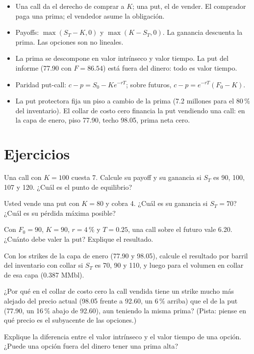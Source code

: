 \begin{resumen}
\begin{itemize}
\item Una call da el derecho de comprar a $K$; una put, el de vender. El comprador paga una prima; el vendedor asume la obligación.
\item Payoffs: $\max(S_T-K,0)$ y $\max(K-S_T,0)$. La ganancia descuenta la prima. Las opciones son no lineales.
\item La prima se descompone en valor intrínseco y valor tiempo. La put del informe (77.90 con $F=86.54$) está fuera del dinero: todo es valor tiempo.
\item Paridad put-call: $c-p=S_0-Ke^{-rT}$; sobre futuros, $c-p=e^{-rT}(F_0-K)$.
\item La put protectora fija un piso a cambio de la prima (7.2 millones para el 80\,\% del inventario). El collar de costo cero financia la put vendiendo una call: en la capa de enero, piso 77.90, techo 98.05, prima neta cero.
\end{itemize}
\end{resumen}

\section*{Ejercicios}

\ejercicio[cálculo] Una call con $K=100$ cuesta 7. Calcule su payoff y su ganancia si $S_T$ es 90, 100, 107 y 120. ¿Cuál es el punto de equilibrio?

\ejercicio[cálculo] Usted vende una put con $K=80$ y cobra 4. ¿Cuál es su ganancia si $S_T=70$? ¿Cuál es su pérdida máxima posible?

\ejercicio[cálculo] Con $F_0=90$, $K=90$, $r=4\,\%$ y $T=0.25$, una call sobre el futuro vale 6.20. ¿Cuánto debe valer la put? Explique el resultado.

\ejercicio[cálculo] Con los strikes de la capa de enero (77.90 y 98.05), calcule el resultado por barril del inventario con collar si $S_T$ es 70, 90 y 110, y luego para el volumen en collar de esa capa (0.387 MMbl).

\ejercicio[conceptual] ¿Por qué en el collar de costo cero la call vendida tiene un strike mucho más alejado del precio actual (98.05 frente a 92.60, un 6\,\% arriba) que el de la put (77.90, un 16\,\% abajo de 92.60), aun teniendo la misma prima? (Pista: piense en qué precio es el subyacente de las opciones.)

\ejercicio[conceptual] Explique la diferencia entre el valor intrínseco y el valor tiempo de una opción. ¿Puede una opción fuera del dinero tener una prima alta?

